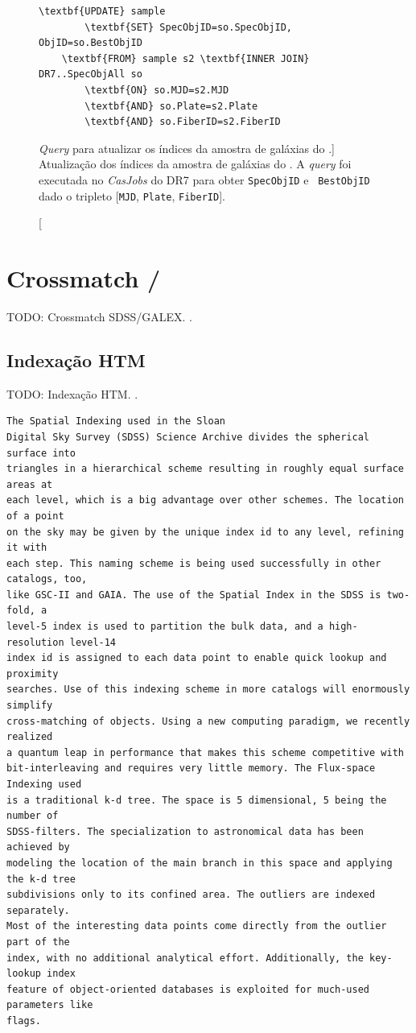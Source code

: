 \begin{figure}
	\begin{Verbatim}[commandchars=\\\{\}]
	\textbf{UPDATE} sample
		\textbf{SET} SpecObjID=so.SpecObjID, ObjID=so.BestObjID
	\textbf{FROM} sample s2 \textbf{INNER JOIN} DR7..SpecObjAll so
		\textbf{ON} so.MJD=s2.MJD
		\textbf{AND} so.Plate=s2.Plate
		\textbf{AND} so.FiberID=s2.FiberID
	\end{Verbatim}
	\caption
	[{\em Query} para atualizar os índices da amostra de galáxias do
	\starlight.]
	{Atualização dos índices da amostra de galáxias do \starlight. A {\em query}
	foi executada no {\em CasJobs} do \SDSS DR7 para obter {\tt SpecObjID} e {\tt
	BestObjID} dado o tripleto [{\tt MJD}, {\tt Plate}, {\tt FiberID}].}
	\label{fig:AtualizaObjIds}
\end{figure}


\section{Crossmatch \SDSS/\galex}
TODO: Crossmatch SDSS/GALEX. \cite{Budavari2009}.

\subsection{Indexação HTM}
TODO: Indexação HTM. \cite{Kunszt2000}.
\begin{verbatim}
The Spatial Indexing used in the Sloan
Digital Sky Survey (SDSS) Science Archive divides the spherical surface into
triangles in a hierarchical scheme resulting in roughly equal surface areas at
each level, which is a big advantage over other schemes. The location of a point
on the sky may be given by the unique index id to any level, refining it with
each step. This naming scheme is being used successfully in other catalogs, too,
like GSC-II and GAIA. The use of the Spatial Index in the SDSS is two-fold, a
level-5 index is used to partition the bulk data, and a high-resolution level-14
index id is assigned to each data point to enable quick lookup and proximity
searches. Use of this indexing scheme in more catalogs will enormously simplify
cross-matching of objects. Using a new computing paradigm, we recently realized
a quantum leap in performance that makes this scheme competitive with
bit-interleaving and requires very little memory. The Flux-space Indexing used
is a traditional k-d tree. The space is 5 dimensional, 5 being the number of
SDSS-filters. The specialization to astronomical data has been achieved by
modeling the location of the main branch in this space and applying the k-d tree
subdivisions only to its confined area. The outliers are indexed separately.
Most of the interesting data points come directly from the outlier part of the
index, with no additional analytical effort. Additionally, the key-lookup index
feature of object-oriented databases is exploited for much-used parameters like
flags.
\end{verbatim}

